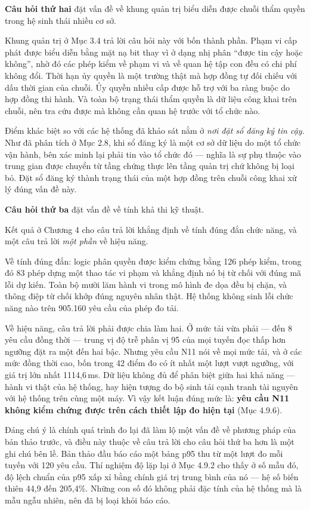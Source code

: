 \noindent \textbf{Câu hỏi thứ hai} đặt vấn đề về khung quản trị biểu diễn được chuỗi thẩm quyền trong hệ sinh thái nhiều cơ sở.

Khung quản trị ở Mục 3.4 trả lời câu hỏi này với bốn thành phần. Phạm vi cấp phát được biểu diễn bằng mặt nạ bit thay vì ở dạng nhị phân {``}được tin cậy hoặc không{''}, nhờ đó các phép kiểm về phạm vi và về quan hệ tập con đều có chi phí không đổi. Thời hạn ủy quyền là một trường thật mà hợp đồng tự đối chiếu với dấu thời gian của chuỗi. Ủy quyền nhiều cấp được hỗ trợ với ba ràng buộc do hợp đồng thi hành. Và toàn bộ trạng thái thẩm quyền là dữ liệu công khai trên chuỗi, nên tra cứu được mà không cần quan hệ trước với tổ chức nào.

Điểm khác biệt so với các hệ thống đã khảo sát nằm ở \emph{nơi đặt sổ đăng ký tin cậy}. Như đã phân tích ở Mục 2.8, khi sổ đăng ký là một cơ sở dữ liệu do một tổ chức vận hành, bên xác minh lại phải tin vào tổ chức đó --- nghĩa là sự phụ thuộc vào trung gian được chuyển từ tầng chứng thực lên tầng quản trị chứ không bị loại bỏ. Đặt sổ đăng ký thành trạng thái của một hợp đồng trên chuỗi công khai xử lý đúng vấn đề này.

\noindent \textbf{Câu hỏi thứ ba} đặt vấn đề về tính khả thi kỹ thuật.

Kết quả ở Chương 4 cho câu trả lời khẳng định về tính đúng đắn chức năng, và một câu trả lời \emph{một phần} về hiệu năng.

Về tính đúng đắn: logic phân quyền được kiểm chứng bằng 126 phép kiểm, trong đó 83 phép dựng một thao tác vi phạm và khẳng định nó bị từ chối với đúng mã lỗi dự kiến. Toàn bộ mười lăm hành vi trong mô hình đe dọa đều bị chặn, và thông điệp từ chối khớp đúng nguyên nhân thật. Hệ thống không sinh lỗi chức năng nào trên 905.160 yêu cầu của phép đo tải.

Về hiệu năng, câu trả lời phải được chia làm hai. Ở mức tải vừa phải --- đến 8 yêu cầu đồng thời --- trung vị độ trễ phân vị 95 của mọi tuyến đọc thấp hơn ngưỡng đặt ra một đến hai bậc. Nhưng yêu cầu N11 nói về mọi mức tải, và ở các mức đồng thời cao, bốn trong 42 điểm đo có ít nhất một lượt vượt ngưỡng, với giá trị lớn nhất 1114,6\,ms. Dữ liệu không đủ để phân biệt giữa hai khả năng --- hành vi thật của hệ thống, hay hiện tượng do bộ sinh tải cạnh tranh tài nguyên với hệ thống trên cùng một máy. Vì vậy kết luận đúng mức là: \textbf{yêu cầu N11 không kiểm chứng được trên cách thiết lập đo hiện tại} (Mục 4.9.6).

Đáng chú ý là chính quá trình đo lại đã làm lộ một vấn đề về phương pháp của bản thảo trước, và điều này thuộc về câu trả lời cho câu hỏi thứ ba hơn là một ghi chú bên lề. Bản thảo đầu báo cáo một bảng p95 thu từ một lượt đo mỗi tuyến với 120 yêu cầu. Thí nghiệm độ lặp lại ở Mục 4.9.2 cho thấy ở số mẫu đó, độ lệch chuẩn của p95 xấp xỉ bằng chính giá trị trung bình của nó --- hệ số biến thiên 44,9 đến 205,4\%. Những con số đó không phải đặc tính của hệ thống mà là mẫu ngẫu nhiên, nên đã bị loại khỏi báo cáo.

